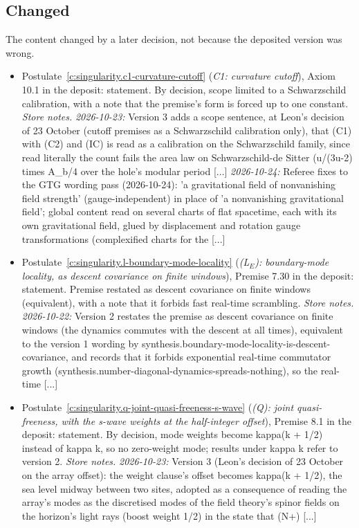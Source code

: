 \documentclass[11pt]{article}
\theoremstyle{definition}
\theoremstyle{plain}
\begin{document}
\subsection*{Changed}
The content changed by a later decision, not because the deposited version was wrong.
\begin{itemize}\setlength{\itemsep}{2pt}
\item Postulate~\ref{c:singularity.c1-curvature-cutoff} (\emph{C1: curvature cutoff}), Axiom 10.1 in the deposit: statement. By decision, scope limited to a Schwarzschild calibration, with a note that the premise's form is forced up to one constant. \emph{Store notes.} \emph{2026-10-23:} Version 3 adds a scope sentence, at Leon's decision of 23 October (cutoff premises as a Schwarzschild calibration only), that (C1) with (C2) and (IC) is read as a calibration on the Schwarzschild family, since read literally the count fails the area law on Schwarzschild-de Sitter (u/(3u-2) times A\_b/4 over the hole's modular period [...] \emph{2026-10-24:} Referee fixes to the GTG wording pass (2026-10-24): 'a gravitational field of nonvanishing field strength' (gauge-independent) in place of 'a nonvanishing gravitational field'; global content read on several charts of flat spacetime, each with its own gravitational field, glued by displacement and rotation gauge transformations (complexified charts for the [...]
\item Postulate~\ref{c:singularity.l-boundary-mode-locality} (\emph{(L$_E$): boundary-mode locality, as descent covariance on finite windows}), Premise 7.30 in the deposit: statement. Premise restated as descent covariance on finite windows (equivalent), with a note that it forbids fast real-time scrambling. \emph{Store notes.} \emph{2026-10-22:} Version 2 restates the premise as descent covariance on finite windows (the dynamics commutes with the descent at all times), equivalent to the version 1 wording by synthesis.boundary-mode-locality-is-descent-covariance, and records that it forbids exponential real-time commutator growth (synthesis.number-diagonal-dynamics-spreads-nothing), so the real-time [...]
\item Postulate~\ref{c:singularity.q-joint-quasi-freeness-s-wave} (\emph{(Q): joint quasi-freeness, with the s-wave weights at the half-integer offset}), Premise 8.1 in the deposit: statement. By decision, mode weights become kappa(k + 1/2) instead of kappa k, so no zero-weight mode; results under kappa k refer to version 2. \emph{Store notes.} \emph{2026-10-23:} Version 3 (Leon's decision of 23 October on the array offset): the weight clause's offset becomes kappa(k + 1/2), the sea level midway between two sites, adopted as a consequence of reading the array's modes as the discretised modes of the field theory's spinor fields on the horizon's light rays (boost weight 1/2) in the state that (N+) [...]

\end{itemize}
\end{document}
